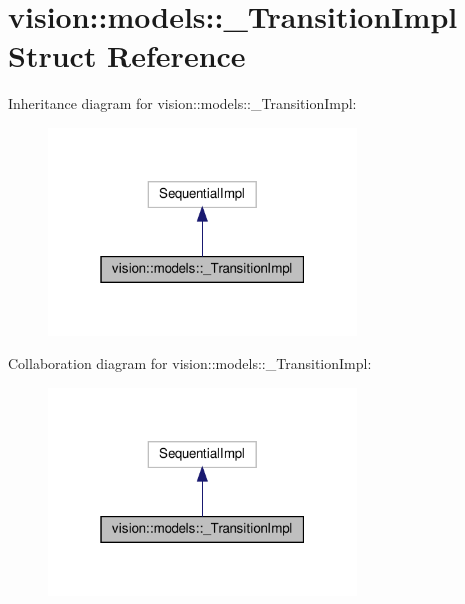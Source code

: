 \hypertarget{structvision_1_1models_1_1__TransitionImpl}{}\section{vision\+:\+:models\+:\+:\+\_\+\+Transition\+Impl Struct Reference}
\label{structvision_1_1models_1_1__TransitionImpl}


Inheritance diagram for vision\+:\+:models\+:\+:\+\_\+\+Transition\+Impl\+:
\nopagebreak
\begin{figure}[H]
\begin{center}
\leavevmode
\includegraphics[width=232pt]{structvision_1_1models_1_1__TransitionImpl__inherit__graph}
\end{center}
\end{figure}


Collaboration diagram for vision\+:\+:models\+:\+:\+\_\+\+Transition\+Impl\+:
\nopagebreak
\begin{figure}[H]
\begin{center}
\leavevmode
\includegraphics[width=232pt]{structvision_1_1models_1_1__TransitionImpl__coll__graph}
\end{center}
\end{figure}
